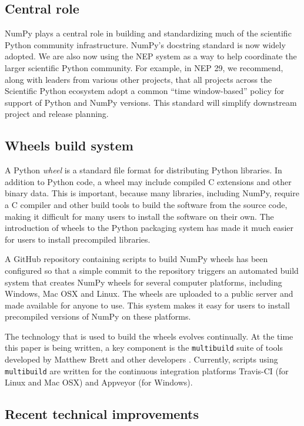 \documentclass[twocolumn]{article}
\begin{document}
\subsection*{Central role}

NumPy plays a central role in building and standardizing much of the scientific
Python community infrastructure.
NumPy's docstring standard is now widely adopted.
We are also now using the NEP system as a way to help coordinate the larger
scientific Python community.
For example, in NEP 29, we recommend, along with leaders from various other
projects, that all projects across the Scientific Python ecosystem adopt a
common ``time window-based'' policy for support of Python and NumPy versions.
This standard will simplify downstream project and release planning.

\subsection*{Wheels build system}

A Python \emph{wheel} \cite{PEP427} is a standard file format for
distributing Python libraries.  In addition to Python code, a
wheel may include compiled C extensions and other binary data.
This is important, because many libraries, including NumPy,
require a C compiler and other build tools to build the software
from the source code, making it difficult for many users to install
the software on their own.  The introduction of wheels to the Python
packaging system has made it much easier for users to install
precompiled libraries.

A GitHub repository containing scripts to build NumPy wheels has
been configured so that a simple commit to the repository triggers
an automated build system that creates NumPy wheels for several
computer platforms, including Windows, Mac OSX and Linux.  The wheels
are uploaded to a public server and made available for anyone to use.
This system makes it easy for users to install precompiled versions
of NumPy on these platforms.

The technology that is used to build the wheels evolves continually.
At the time this paper is being written, a key component is the
\texttt{multibuild} suite of tools developed by Matthew Brett and
other developers \cite{multibuild}.  Currently, scripts using
\texttt{multibuild} are written for the continuous integration
platforms Travis-CI (for Linux and Mac OSX) and Appveyor
(for Windows).

\subsection*{Recent technical improvements}
\end{document}
